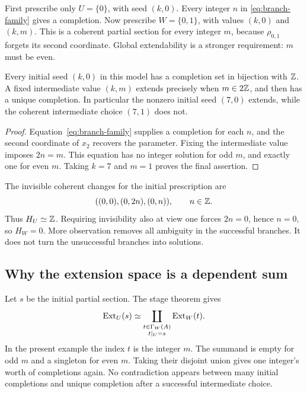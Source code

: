 First prescribe only \(U=\{0\}\), with seed \((k,0)\). Every integer \(n\) in \eqref{eq:branch-family} gives a completion. Now prescribe \(W=\{0,1\}\), with values \((k,0)\) and \((k,m)\). This is a coherent partial section for every integer \(m\), because \(\rho_{0,1}\) forgets its second coordinate. Global extendability is a stronger requirement: \(m\) must be even.

\begin{proposition}\label{KS60}
Every initial seed \((k,0)\) in this model has a completion set in bijection with \(\mathbb Z\). A fixed intermediate value \((k,m)\) extends precisely when \(m\in2\mathbb Z\), and then has a unique completion. In particular the nonzero initial seed \((7,0)\) extends, while the coherent intermediate choice \((7,1)\) does not.
\end{proposition}
\begin{proof}
Equation~\eqref{eq:branch-family} supplies a completion for each \(n\), and the second coordinate of \(x_2\) recovers the parameter. Fixing the intermediate value imposes \(2n=m\). This equation has no integer solution for odd \(m\), and exactly one for even \(m\). Taking \(k=7\) and \(m=1\) proves the final assertion.
\end{proof}
The invisible coherent changes for the initial prescription are
\[
 ((0,0),(0,2n),(0,n)),\qquad n\in\mathbb Z.
\]
Thus \(H_U\simeq\mathbb Z\). Requiring invisibility also at view one forces \(2n=0\), hence \(n=0\), so \(H_W=0\). More observation removes all ambiguity in the successful branches. It does not turn the unsuccessful branches into solutions.


\subsection{Why the extension space is a dependent sum}
Let \(s\) be the initial partial section. The stage theorem gives
\[
 \operatorname{Ext}_U(s)\simeq
 \coprod_{\substack{t\in\Gamma_W(A)\\t|_U=s}}\operatorname{Ext}_W(t).
\]
In the present example the index \(t\) is the integer \(m\). The summand is empty for odd \(m\) and a singleton for even \(m\). Taking their disjoint union gives one integer's worth of completions again. No contradiction appears between many initial completions and unique completion after a successful intermediate choice.

